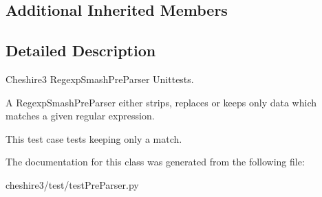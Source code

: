 \subsection*{Additional Inherited Members}


\subsection{Detailed Description}
\begin{DoxyVerb}Cheshire3 RegexpSmashPreParser Unittests.

A RegexpSmashPreParser either strips, replaces or keeps only data which 
matches a given regular expression.

This test case tests keeping only a match.
\end{DoxyVerb}
 

The documentation for this class was generated from the following file\-:\begin{DoxyCompactItemize}
\item 
cheshire3/test/test\-Pre\-Parser.\-py\end{DoxyCompactItemize}
